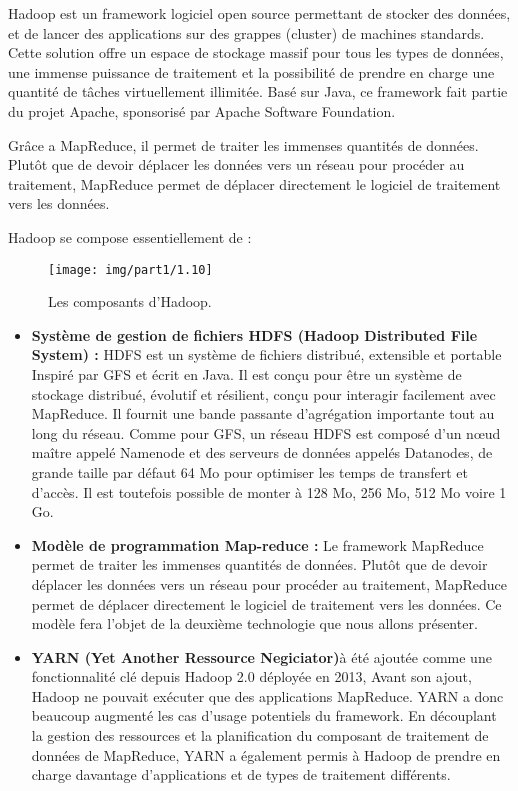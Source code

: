 \begin{enumerate}[label=\protect\ding{\value*}, start=182,font=\color{blue}]
Hadoop est un framework logiciel open source permettant de stocker des données, et de lancer des applications sur des grappes (cluster) de machines standards. Cette solution offre un espace de stockage massif pour tous les types de données, une immense puissance de traitement et la possibilité de prendre en charge une quantité de tâches virtuellement illimitée. Basé sur Java, ce framework fait partie du projet Apache, sponsorisé par Apache Software Foundation.

Grâce a MapReduce, il permet de traiter les immenses quantités de données. Plutôt que de devoir déplacer les données vers un réseau pour procéder au traitement, MapReduce permet de déplacer directement le logiciel de traitement vers les données. 

Hadoop se compose essentiellement de :

\begin{figure}[h]
	\centering
	\texttt{[image: img/part1/1.10]}
	\caption{Les composants d'Hadoop.}
\end{figure}

\begin{itemize}[label=]
\item \textbf{Système de gestion de fichiers HDFS (Hadoop Distributed File System) :} HDFS est un système de fichiers distribué, extensible et portable Inspiré par GFS et écrit en Java. Il est conçu pour être un système de stockage distribué, évolutif et résilient, conçu pour interagir facilement avec MapReduce. Il fournit une bande passante d'agrégation importante tout au long du réseau. Comme pour GFS, un réseau HDFS est composé d'un nœud maître appelé Namenode et des serveurs de données appelés Datanodes, de grande taille par défaut 64 Mo pour optimiser les temps de transfert et d'accès. Il est toutefois possible de monter à 128 Mo, 256 Mo, 512 Mo voire 1 Go.
\item \textbf{Modèle de programmation Map-reduce :} Le framework MapReduce permet de traiter les immenses quantités de données. Plutôt que de devoir déplacer les données vers un réseau pour procéder au traitement, MapReduce permet de déplacer directement le logiciel de traitement vers les données. Ce modèle fera l'objet de la deuxième technologie que nous allons présenter.
\item \textbf{YARN (Yet Another Ressource Negiciator)}à été ajoutée comme une fonctionnalité clé depuis Hadoop 2.0 déployée en 2013, Avant son ajout, Hadoop ne pouvait exécuter que des applications MapReduce. YARN a donc beaucoup augmenté les cas d’usage potentiels du framework. En découplant la gestion des ressources et la planification du composant de traitement de données de MapReduce, YARN a également permis à Hadoop de prendre en charge davantage d’applications et de types de traitement différents.


\end{itemize}
\end{enumerate}
